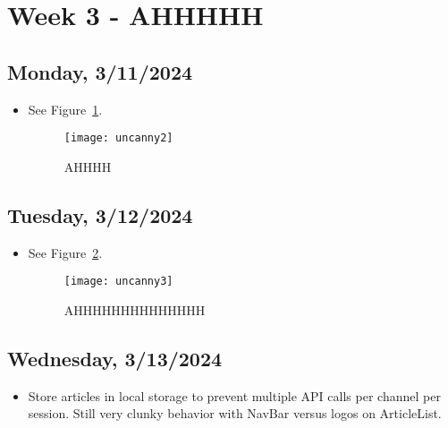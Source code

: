 \newpage
\section{Week 3 - AHHHHH}

\subsection*{Monday, 3/11/2024}
\begin{itemize}
    \item See Figure~\ref{fig:uncanny2}.
    \begin{figure}[ht]
        \centering
        \texttt{[image: uncanny2]}
        \captionsetup{labelfont=bf, textfont=it}
        \caption{AHHHH}
        \label{fig:uncanny2}
    \end{figure}
\end{itemize}

\subsection*{Tuesday, 3/12/2024}
\begin{itemize}
    \item See Figure~\ref{fig:uncanny3}.
    \begin{figure}[ht]
        \centering
        \texttt{[image: uncanny3]}
        \captionsetup{labelfont=bf, textfont=it}
        \caption{AHHHHHHHHHHHHHH}
        \label{fig:uncanny3}
    \end{figure}
\end{itemize}

\subsection*{Wednesday, 3/13/2024}
\begin{itemize}
    \item Store articles in local storage to prevent multiple API calls per
        channel per session. Still very clunky behavior with NavBar versus logos
        on ArticleList.
\end{itemize}

